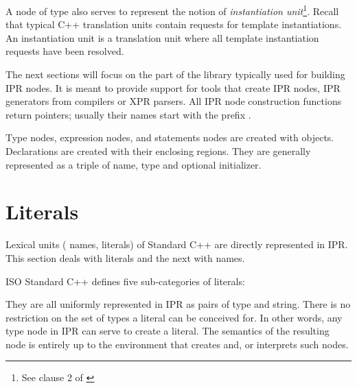 \documentclass[11pt]{article}
\begin{document}
A node of type  also serves to represent the notion of 
\emph{instantiation unit}\footnote{See clause 2 of \cite{iso98, iso03}}.
Recall that typical C++ translation units contain requests for template
instantiations.  An instantiation unit is a translation unit where all
template instantiation requests have been resolved.


The next sections will focus on the part of the library typically used for
building IPR nodes.  It is meant to provide support for tools that create IPR
nodes, \eg{} IPR generators from compilers or XPR parsers.  All IPR
node construction functions return pointers; usually their names start with
the prefix .  

Type nodes, expression nodes, and statements nodes are created with
 objects.  Declarations are created with their enclosing
regions.  They are generally represented as a triple of name, type and
optional initializer.


\section{Literals}
\label{sec:literals}

Lexical units (\eg{} names, literals) of Standard C++ are directly represented
in IPR. This section deals with literals and the next with names.

ISO Standard C++ defines five sub-categories of literals:
\begin{Grammar}
\end{Grammar}
They are all uniformly represented in IPR as pairs of type and string.
There is no restriction on the set of types a literal can be conceived for.
In other words, any type node in IPR can serve to create a literal.  The
semantics of the resulting node is entirely up to the environment that creates
and, or interprets such nodes. 

\end{document}
